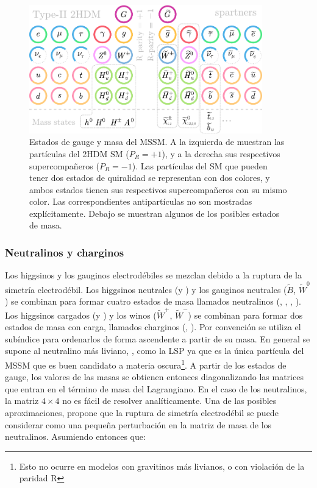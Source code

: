 \begin{figure}
  \centering
  \includegraphics[width=0.9\textwidth]{images/theory/sm_susy_v2.pdf}
  \caption{Estados de gauge y masa del MSSM. A la izquierda de muestran las partículas del 2HDM SM ($P_R = +1$), y a la derecha sus respectivos supercompañeros ($P_R = -1$). Las partículas del SM que pueden tener dos estados de quiralidad se representan con dos colores, y ambos estados tienen sus respectivos supercompañeros con su mismo color. Las correspondientes antipartículas no son mostradas explícitamente. Debajo se muestran algunos de los posibles estados de masa. 
  }
  \label{fig:susy_part}
\end{figure}

\subsubsection{Neutralinos y charginos}

Los higgsinos y los gauginos electrodébiles se mezclan debido a la ruptura de la simetría electrodébil. Los higgsinos neutrales (\Hinouzero y \Hinodzero) y los gauginos neutrales ($\widetilde{B}$, $\widetilde{W}^0$) se combinan para formar cuatro estados de masa llamados neutralinos (\ninoone, \ninotwo, \ninothree, \ninofour). Los higgsinos cargados (\Hinoup y \Hinodm) y los winos ($\widetilde{W}^+$, $\widetilde{W}^-$) se combinan para formar dos estados de masa con carga, llamados charginos (\chinoonepm, \chinotwopm). Por convención se utiliza el subíndice para ordenarlos de forma ascendente a partir de su masa. En general se supone al neutralino más liviano, \ninoone, como la LSP ya que es la única partícula del MSSM que es buen candidato a materia oscura\footnote{Esto no ocurre en modelos con gravitinos más livianos, o con violación de la paridad R}. A partir de los estados de gauge, los valores de las masas se obtienen entonces diagonalizando las matrices que entran en el término de masa del Lagrangiano. En el caso de los neutralinos, la matriz $4\times4$ no es fácil de resolver analíticamente. Una de las posibles aproximaciones, propone que la ruptura de simetría electrodébil se puede considerar como una pequeña perturbación en la matriz de masa de los neutralinos. Asumiendo entonces que: 

